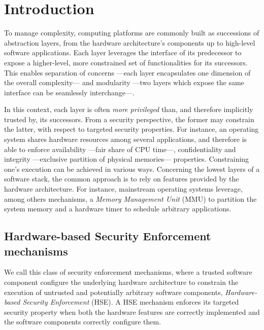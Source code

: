 \chapter{Introduction}


\vspace{1cm}\noindent To manage complexity, computing platforms are commonly
built as successions of abstraction layers, from the hardware architecture's
components up to high-level software applications.
%
Each layer leverages the interface of its predecessor to expose a higher-level,
more constrained set of functionalities for its successors.
%
This enables separation of concerns ---each layer encapsulates one dimension of
the overall complexity--- and modularity ---two layers which expose the same
interface can be seamlessly interchange---.

In this context, each layer is often \emph{more privileged} than, and therefore
implicitly trusted by, its successors.
%
From a security perspective, the former may constrain the latter, with respect
to targeted security properties.
%
For instance, an operating system shares hardware resources among several
applications, and therefore is able to enforce availability ---fair share of CPU
time---, confidentiality and integrity ---exclusive partition of physical
memories--- properties.
%
Constraining one's execution can be achieved in various ways.
%
Concerning the lowest layers of a software stack, the common approach is to rely
on features provided by the hardware architecture.
%
For instance, mainstream operating systems leverage, among others mechanisms, a
\emph{Memory Management Unit} (MMU) to partition the system memory and a
hardware timer to schedule arbitrary applications.

\section{Hardware-based Security Enforcement mechanisms}

We call this class of security enforcement mechanisms, where a trusted software
component configure the underlying hardware architecture to constrain the
execution of untrusted and potentially arbitrary software components,
\emph{Hardware-based Security Enforcement} (HSE).
%
A HSE mechanism enforces its targeted security property when both the hardware
features are correctly implemented and the software components correctly
configure them.

